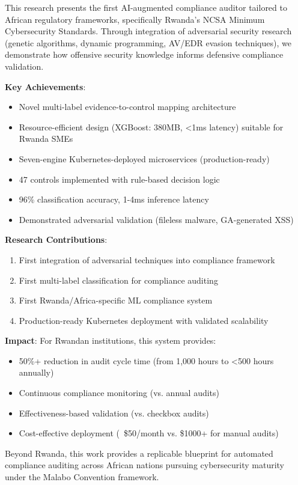 \documentclass[11pt,conference]{IEEEtran}
\begin{document}
This research presents the first AI-augmented compliance auditor tailored to African regulatory frameworks, specifically Rwanda's NCSA Minimum Cybersecurity Standards. Through integration of adversarial security research (genetic algorithms, dynamic programming, AV/EDR evasion techniques), we demonstrate how offensive security knowledge informs defensive compliance validation.

\textbf{Key Achievements}:
\begin{itemize}
    \item Novel multi-label evidence-to-control mapping architecture
    \item Resource-efficient design (XGBoost: 380MB, <1ms latency) suitable for Rwanda SMEs
    \item Seven-engine Kubernetes-deployed microservices (production-ready)
    \item 47 controls implemented with rule-based decision logic
    \item 96\% classification accuracy, 1-4ms inference latency
    \item Demonstrated adversarial validation (fileless malware, GA-generated XSS)
\end{itemize}

\textbf{Research Contributions}:
\begin{enumerate}
    \item First integration of adversarial techniques into compliance framework
    \item First multi-label classification for compliance auditing
    \item First Rwanda/Africa-specific ML compliance system
    \item Production-ready Kubernetes deployment with validated scalability
\end{enumerate}

\textbf{Impact}:
For Rwandan institutions, this system provides:
\begin{itemize}
    \item 50\%+ reduction in audit cycle time (from 1,000 hours to <500 hours annually)
    \item Continuous compliance monitoring (vs. annual audits)
    \item Effectiveness-based validation (vs. checkbox audits)
    \item Cost-effective deployment (~\$50/month vs. \$1000+ for manual audits)
\end{itemize}

Beyond Rwanda, this work provides a replicable blueprint for automated compliance auditing across African nations pursuing cybersecurity maturity under the Malabo Convention framework.
\end{document}
